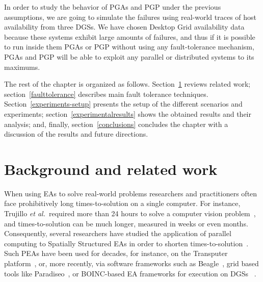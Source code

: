 \documentclass[graybox]{sty/svmult}
\begin{document}
In order to study the behavior of PGAs and PGP under the previous assumptions, we are going to simulate the failures using 
real-world traces of host availability from three DGSs. We have chosen Desktop Grid availability data because these systems
exhibit large amounts of failures, and thus if it is possible to run inside them PGAs or PGP without using any fault-tolerance
mechanism, PGAs and PGP will be able to exploit any parallel or distributed systems to its maximums.

The rest of the chapter is organized as follows. Section~\ref{related-work} reviews related
work; section~\ref{faulttolerance} describes main fault tolerance techniques.
Section~\ref{experiments-setup} presents the setup of the different
scenarios and experiments; 
section~\ref{experimentalresults} shows the obtained results and their
analysis; and, finally, section~\ref{conclusions} concludes the chapter with a discussion of the results and future directions.

\section{Background and related work}
\label{related-work}

When using EAs to solve real-world problems researchers and practitioners often face prohibitively
long times-to-solution on a single computer.  For instance,
Trujillo \emph{et al.}~required more than 24 hours to solve a computer
vision problem~\cite{ipgp2}, and times-to-solution can be
much longer, measured in weeks or even months. Consequently,
several researchers have studied the application of parallel
computing to Spatially Structured EAs in order to shorten
times-to-solution~\cite{Fernandez:PGP, spatially-structured-EAs, parallel-ga-survey}.
Such PEAs have been used for decades, for instance, on the Transputer
platform~\cite{transputer}, or, more recently, via software frameworks
such as Beagle~\cite{master-slave-framework-beagle}, grid based tools
like Paradiseo~\cite{grid-parallel-bioinspired-algorithms}, or BOINC-based EA frameworks for
execution on DGSs ~\cite{vmware-boinc-ipgp}.
\end{document}
